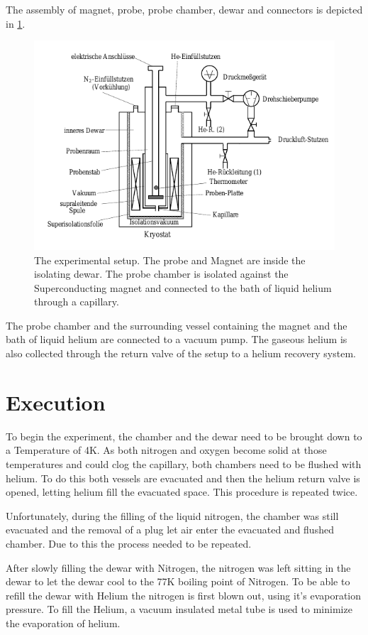 The assembly of magnet, probe, probe chamber, dewar and connectors is depicted in \ref{fig:setup}.
\begin{figure}[h]
    \centering
    \includegraphics[width=15.8cm]{fig/setup.png}
	\caption{The experimental setup. The probe and Magnet are inside the isolating dewar. The probe chamber is isolated against the Superconducting
	magnet and connected to the bath of liquid helium through a capillary.}
	\label{fig:setup}
\end{figure}

The probe chamber and the surrounding vessel containing the magnet and the bath of liquid helium are connected to a vacuum pump. The gaseous helium is
also collected through the return valve of the setup to a helium recovery system.

\section{Execution}
To begin the experiment, the chamber and the dewar need to be brought down to a Temperature of 4K.
As both nitrogen and oxygen become solid at those temperatures and could clog the capillary, both chambers need to be flushed with helium. To do this
both vessels are evacuated and then the helium return valve is opened, letting helium fill the evacuated space. This procedure is repeated twice.

Unfortunately, during the filling of the liquid nitrogen, the chamber was still evacuated and the removal of a plug let air enter the evacuated and
flushed chamber. Due to this the process needed to be repeated.

After slowly filling the dewar with Nitrogen, the nitrogen was left sitting in the dewar to let the dewar cool to the 77K boiling point of Nitrogen.
To be able to refill the dewar with Helium the nitrogen is first blown out, using it's evaporation pressure. To fill the Helium, a vacuum insulated
metal tube is used to minimize the evaporation of helium.

